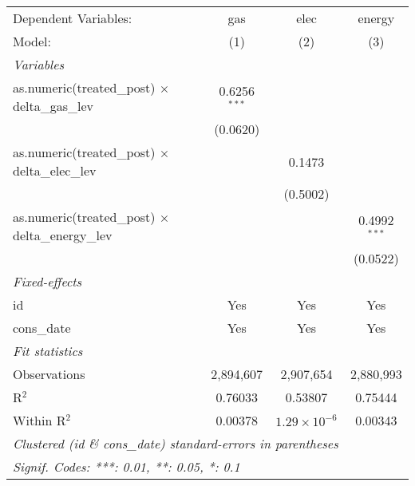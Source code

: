 
\begingroup
\centering
\begin{tabular}{lccc}
   \tabularnewline \midrule \midrule
   Dependent Variables:                                      & gas            & elec                  & energy\\  
   Model:                                                    & (1)            & (2)                   & (3)\\  
   \midrule
   \emph{Variables}\\
   as.numeric(treated\_post) $\times$ delta\_gas\_lev        & 0.6256$^{***}$ &                       &   \\   
                                                             & (0.0620)       &                       &   \\   
   as.numeric(treated\_post) $\times$ delta\_elec\_lev       &                & 0.1473                &   \\   
                                                             &                & (0.5002)              &   \\   
   as.numeric(treated\_post) $\times$ delta\_energy\_lev     &                &                       & 0.4992$^{***}$\\   
                                                             &                &                       & (0.0522)\\   
   \midrule
   \emph{Fixed-effects}\\
   id                                                        & Yes            & Yes                   & Yes\\  
   cons\_date                                                & Yes            & Yes                   & Yes\\  
   \midrule
   \emph{Fit statistics}\\
   Observations                                              & 2,894,607      & 2,907,654             & 2,880,993\\  
   R$^2$                                                     & 0.76033        & 0.53807               & 0.75444\\  
   Within R$^2$                                              & 0.00378        & $1.29\times 10^{-6}$  & 0.00343\\  
   \midrule \midrule
   \multicolumn{4}{l}{\emph{Clustered (id \& cons\_date) standard-errors in parentheses}}\\
   \multicolumn{4}{l}{\emph{Signif. Codes: ***: 0.01, **: 0.05, *: 0.1}}\\
\end{tabular}
\par\endgroup



